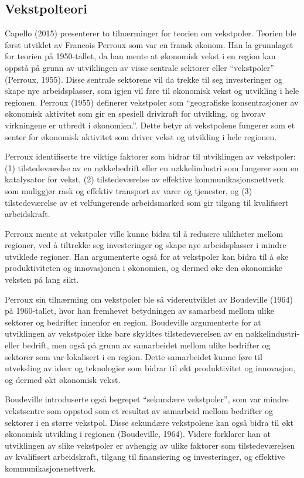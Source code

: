 \documentclass[
]{article}
\begin{document}
\hypertarget{vekstpolteori}{%
\subsection{Vekstpolteori}\label{vekstpolteori}}

Capello (2015) presenterer to tilnærminger for teorien om vekstpoler.
Teorien ble først utviklet av Francois Perroux som var en fransk økonom.
Han la grunnlaget for teorien på 1950-tallet, da han mente at økonomisk
vekst i en region kan oppstå på grunn av utviklingen av visse sentrale
sektorer eller ``vekstpoler'' (Perroux, 1955). Disse sentrale sektorene
vil da trekke til seg investeringer og skape nye arbeidsplasser, som
igjen vil føre til økonomisk vekst og utvikling i hele regionen. Perroux
(1955) definerer vekstpoler som ``geografiske konsentrasjoner av
økonomisk aktivitet som gir en spesiell drivkraft for utvikling, og
hvorav virkningene er utbredt i økonomien.''. Dette betyr at vekstpolene
fungerer som et senter for økonomisk aktivitet som driver vekst og
utvikling i hele regionen.

Perroux identifiserte tre viktige faktorer som bidrar til utviklingen av
vekstpoler: (1) tilstedeværelse av en nøkkebedrift eller en
nøkkelindustri som fungerer som en katalysator for vekst, (2)
tilstedeværelse av effektive kommunikasjonsnettverk som muliggjør rask
og effektiv transport av varer og tjenester, og (3) tilstedeværelse av
et velfungerende arbeidsmarked som gir tilgang til kvalifisert
arbeidskraft.

Perroux mente at vekstpoler ville kunne bidra til å redusere ulikheter
mellom regioner, ved å tiltrekke seg investeringer og skape nye
arbeidsplasser i mindre utviklede regioner. Han argumenterte også for at
vekstpoler kan bidra til å øke produktiviteten og innovasjonen i
økonomien, og dermed øke den økonomiske veksten på lang sikt.

Perroux sin tilnærming om vekstpoler ble så videreutviklet av Boudeville
(1964) på 1960-tallet, hvor han fremhevet betydningen av samarbeid
mellom ulike sektorer og bedrifter innenfor en region. Boudeville
argumenterte for at utviklingen av vekstpoler ikke bare skyldtes
tilstedeværelsen av en nøkkelindustri- eller bedrift, men også på grunn
av samarbeidet mellom ulike bedrifter og sektorer som var lokalisert i
en region. Dette samarbeidet kunne føre til utveksling av ideer og
teknologier som bidrar til økt produktivitet og innovasjon, og dermed
økt økonomisk vekst.

Boudeville introduserte også begrepet ``sekundære vekstpoler'', som var
mindre vekstsentre som oppstod som et resultat av samarbeid mellom
bedrifter og sektorer i en større vekstpol. Disse sekundære vekstpolene
kan også bidra til økt økonomisk utvikling i regionen (Boudeville,
1964). Videre forklarer han at utviklingen av slike vekstpoler er
avhengig av ulike faktorer som tilstedeværelsen av kvalifisert
arbeidskraft, tilgang til finansiering og investeringer, og effektive
kommunikasjonsnettverk.
\end{document}
